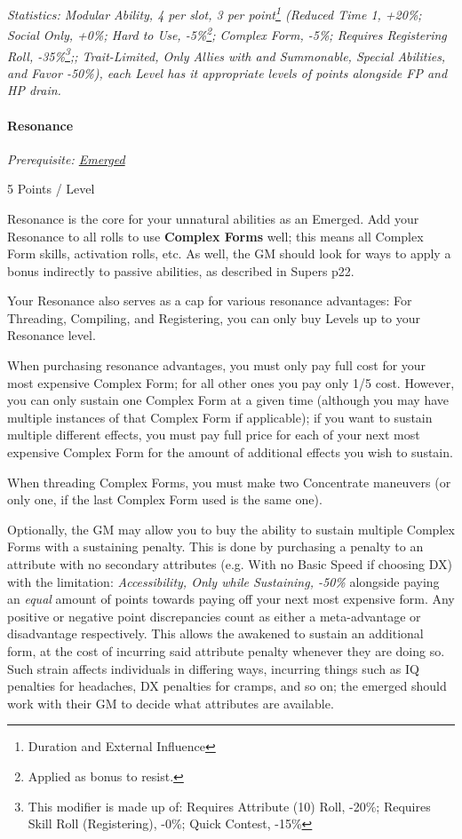 \begin{multicols*}{3}
	\textit{\textcolor{OliveGreen}{Statistics: Modular Ability, 4 per slot, 3 per point\footnote{Duration and External Influence} (Reduced Time 1, +20\%; Social Only, +0\%; Hard to Use, -5\%\footnote{Applied as bonus to resist.}; Complex Form, -5\%; Requires Registering Roll, -35\%\footnote{This modifier is made up of: Requires Attribute (10) Roll, -20\%; Requires Skill Roll (Registering), -0\%; Quick Contest, -15\%};; Trait-Limited, Only Allies with and Summonable, Special Abilities, and Favor -50\%), each Level has it appropriate levels of points alongside FP and HP drain.}}
	
	\paragraph{Resonance}
	\textit{Prerequisite: \hyperref[emerged]{Emerged}}
	\begin{flushright}
		5 Points / Level
	\end{flushright}
	
	Resonance is the core for your unnatural abilities as an Emerged. Add your Resonance to all rolls to use \textbf{Complex Forms} well; this means all Complex Form skills, activation rolls, etc. As well, the GM should look for ways to apply a bonus indirectly to passive abilities, as described in \GURPS Supers p22.
	
	Your Resonance also serves as a cap for various resonance advantages: For Threading, Compiling, and Registering, you can only buy Levels up to your Resonance level.
	
	When purchasing resonance advantages, you must only pay full cost for your most expensive Complex Form; for all other ones you pay only 1/5 cost. However, you can only sustain one Complex Form at a given time (although you may have multiple instances of that Complex Form if applicable); if you want to sustain multiple different effects, you must pay full price for each of your next most expensive Complex Form for the amount of additional effects you wish to sustain.
	
	When threading Complex Forms, you must make two Concentrate maneuvers (or only one, if the last Complex Form used is the same one).
	
	Optionally, the GM may allow you to buy the ability to sustain multiple Complex Forms with a sustaining penalty. This is done by purchasing a penalty to an attribute with no secondary attributes (e.g. With no Basic Speed if choosing DX) with the limitation: \textit{Accessibility, Only while Sustaining, -50\%} alongside paying an \textit{equal} amount of points towards paying off your next most expensive form. Any positive or negative point discrepancies count as either a meta-advantage or disadvantage respectively. This allows the awakened to sustain an additional form, at the cost of incurring said attribute penalty whenever they are doing so. Such strain affects individuals in differing ways, incurring things such as IQ penalties for headaches, DX penalties for cramps, and so on; the emerged should work with their GM to decide what attributes are available. 
	

\end{multicols*}
